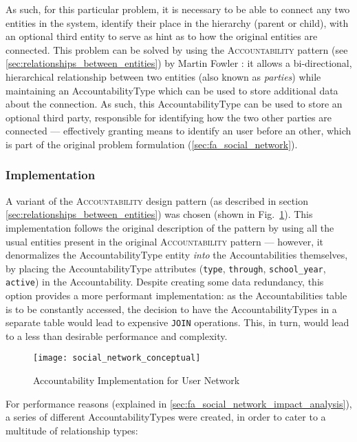 As such, for this particular problem, it is necessary to be able to connect any two entities in the system, identify their place in the hierarchy (parent or child), with an optional third entity to serve as hint as to how the original entities are connected. This problem can be solved by using the \textsc{Accountability} pattern (see \ref{sec:relationships_between_entities}) by Martin Fowler \cite{fowler_accountability}: it allows a bi-directional, hierarchical relationship between two entities (also known as \emph{parties}) while maintaining an AccountabilityType which can be used to store additional data about the connection. As such, this AccountabilityType can be used to store an optional third party, responsible for identifying how the two other parties are connected --- effectively granting means to identify an user before an other, which is part of the original problem formulation (\ref{sec:fa_social_network}).

\subsubsection{Implementation}\label{sec:fa_social_network_implementation}

A variant of the \textsc{Accountability} design pattern (as described in section \ref{sec:relationships_between_entities}) was chosen (shown in Fig.~\ref{fig:social_network_conceptual}). This implementation follows the original description of the pattern by using all the usual entities present in the original \textsc{Accountability} pattern \cite{fowler_accountability} --- however, it denormalizes the AccountabilityType entity \emph{into} the Accountabilities themselves, by placing the AccountabilityType attributes (\verb!type!, \verb!through!, \verb!school_year!, \verb!active!) in the Accountability. Despite creating some data redundancy, this option provides a more performant implementation: as the Accountabilities table is to be constantly accessed, the decision to have the AccountabilityTypes in a separate table would lead to expensive \verb!JOIN! operations. This, in turn, would lead to a less than desirable performance and complexity.

\begin{figure}[H]
  \centering
  \texttt{[image: social\_network\_conceptual]}
  \caption{Accountability Implementation for User Network}
  \label{fig:social_network_conceptual}
\end{figure}

For performance reasons (explained in \ref{sec:fa_social_network_impact_analysis}), a series of different AccountabilityTypes were created, in order to cater to a multitude of relationship types:

